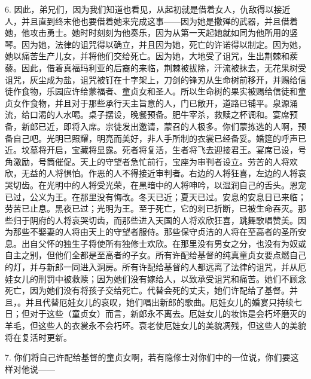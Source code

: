 6. 因此，弟兄们，因为我们知道也看见，从起初就是借着女人，仇敌得以接近人，并且直到终末他也要借着她来完成这事——因为她是撒殚的武器，并且借着她，他攻击勇士。她时时刻刻为他奏乐，因为从第一天起她就如同为他所用的竖琴。因为她，法律的诅咒得以确立，并且因为她，死亡的许诺得以制定。因为她，她以痛苦生产儿女，并将他们交给死亡。因为她，大地受了诅咒，生出荆棘和蒺藜。因此，借着真福玛利亚的后裔的来临，荆棘被拔除，汗流被抹去，无花果树受诅咒，灰尘成为盐，诅咒被钉在十字架上，刀剑的锋刃从生命树前移开，并赐给信徒作食物，乐园应许给蒙福者、童贞女和圣人。所以生命树的果实被赐给信徒和童贞女作食物，并且对于那些承行天主旨意的人，门已敞开，道路已铺平。泉源涌流，给口渴的人水喝。桌子摆设，晚餐预备。肥牛宰杀，救赎之杯调和。宴席预备，新郎已近，即将入席。宗徒发出邀请，蒙召的人极多。你们蒙拣选的人啊，预备自己吧。光明已照耀，明亮而美好，非人手所制的衣裳已经备妥。婚筵的呼声已近。坟墓将开启，宝藏将显露。死者将复活，生者将飞去迎接君王。宴席已设，号角激励，号筒催促。天上的守望者急忙前行，宝座为审判者设立。劳苦的人将欢欣，无益的人将惧怕。作恶的人不得接近审判者。右边的人将狂喜，左边的人将哀哭切齿。在光明中的人将受光荣，在黑暗中的人将呻吟，以湿润自己的舌头。恩宠已过，公义为王。在那里没有悔改。冬天已近；夏天已过。安息的安息日已来临；劳苦已止息。黑夜已过；光明为王。至于死亡，它的刺已折断，已被生命吞灭。那些归于阴府的人将哀哭切齿，而那些进入天国的人将欢欣狂喜，跳舞歌唱赞美。因为那些不娶妻的人将由天上的守望者服侍。那些保守贞洁的人将在至高者的圣所安息。出自父怀的独生子将使所有独修士欢欣。在那里没有男女之分，也没有为奴或自主之别，但他们全都是至高者的子女。所有许配给基督的纯真童贞女要点燃自己的灯，并与新郎一同进入洞房。所有许配给基督的人都远离了法律的诅咒，并从厄娃女儿的刑罚中被救赎；因为她们没有嫁给人，以致承受诅咒和痛苦。她们不顾念死亡，因为她们没有将孩子交给死亡。代替会死的丈夫，她们许配给了基督。并且，。并且代替厄娃女儿的哀叹，她们唱出新郎的歌曲。厄娃女儿的婚宴只持续七日；但对于这些（童贞女）而言，新郎永不离去。厄娃女儿的妆饰是会朽坏磨灭的羊毛，但这些人的衣裳永不会朽坏。衰老使厄娃女儿的美貌凋残，但这些人的美貌将在复活时更新。\par

7. 你们将自己许配给基督的童贞女啊，若有隐修士对你们中的一位说，你们要这样对他说——\par

